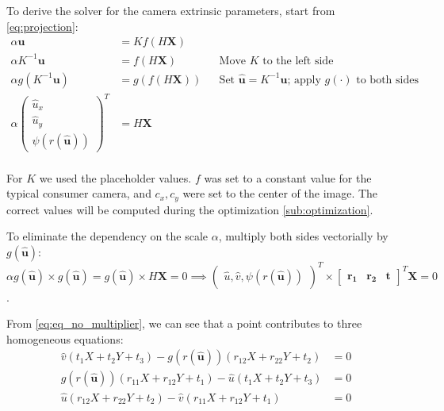 To derive the solver for the camera extrinsic parameters, start from
\cref{eq:projection}:
\begin{align}
	\alpha \mathbf{u}                                  & = K f(H\mathbf{X})                  \\
	\alpha K^{-1} \mathbf{u}                           & = f(H\mathbf{X})    &  &
	\text{Move \(K\) to the left side}                                                       \\
	\alpha g( K^{-1}\mathbf{u})                        & = g(f(H\mathbf{X})) &  &
	\text{Set \(\mathbf{\widehat{u}} = K^{-1}\mathbf{u}\); apply \(g(\cdot)\) to both sides} \\
	\alpha \begin{pmatrix}
		       \widehat{u}_x \\ \widehat{u}_y \\ \psi(r(\mathbf{\widehat{u}}))
	       \end{pmatrix}^{T} & = H\mathbf{X}                                 \\
\end{align}

For \(K\) we used the placeholder values. \(f\) was set to a constant value for
the typical consumer camera, and \(c_x, c_y\) were set to the center of the
image.
The correct values will be computed during the optimization \cref{sub:optimization}.

To eliminate the dependency on the scale \(\alpha\), multiply both sides
vectorially by \(g(\mathbf{\widehat{u}})\):
\begin{equation}
	\alpha g(\mathbf{\widehat{u}}) \times g(\mathbf{\widehat{u}})
	= g(\mathbf{\widehat{u}}) \times H\mathbf{X}
	= 0 \implies
	\begin{pmatrix}
		\widehat{u}, \widehat{v}, \psi(r(\mathbf{\widehat{u}}))
	\end{pmatrix}^{T} \times \begin{bmatrix}
		\mathbf{r_1} & \mathbf{r_2} & \mathbf{t}
	\end{bmatrix}^{T} \mathbf{X} = 0
	\label{eq:eq_no_multiplier}
\end{equation}.

From \cref{eq:eq_no_multiplier}, we can see that a point contributes to three
homogeneous equations:
\begin{align}
	\widehat{v} (t_1X + t_2 Y + t_3) -
	g(r(\mathbf{\widehat{u}})) (r_{12}X + r_{22}Y + t_2 ) & = 0
	\label{eq:scaramuzza_system_1}                              \\
	g(r(\mathbf{\widehat{u}})) (r_{11}X + r_{12}Y + t_1) -
	\widehat{u} (t_1X + t_2 Y + t_3)                      & = 0
	\label{eq:scaramuzza_system_2}                              \\
	\widehat{u} (r_{12}X + r_{22}Y + t_2 ) -
	\widehat{v} (r_{11}X + r_{12}Y + t_1)                 & = 0
	\label{eq:scaramuzza_system_3}
\end{align}

